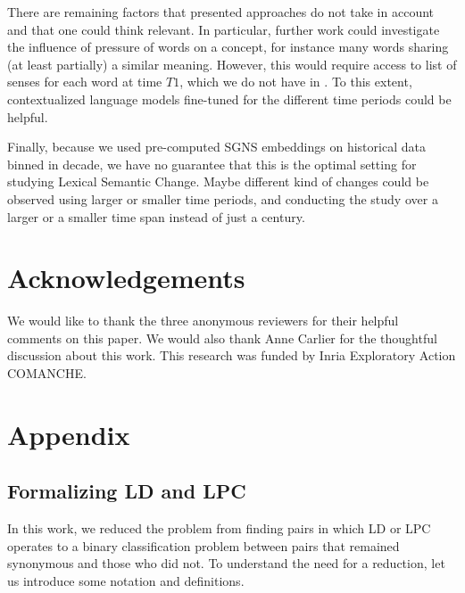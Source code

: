 \documentclass[11pt]{article}
\newcommand{\firstTime}{T1}
\begin{document}
There are remaining factors that presented approaches do not take in account and that one could think relevant. In particular, further work could investigate the influence of pressure of words on a concept, for instance many words sharing (at least partially) a similar meaning. However, this would require access to list of senses for each word at time $\firstTime$, which we do not have in \citet{fernald1896english}. To this extent, contextualized language models fine-tuned for the different time periods could be helpful.


Finally, because we used pre-computed SGNS embeddings on historical data binned in decade, we have no guarantee that this is the optimal setting for studying Lexical Semantic Change. Maybe different kind of changes could be observed using larger or smaller time periods, and conducting the study over a larger or a smaller time span instead of just a century.


\section*{Acknowledgements}

We would like to thank the three anonymous reviewers for their helpful comments on this paper. We would also thank Anne Carlier for the thoughtful discussion about this work. This research was funded by Inria Exploratory Action COMANCHE.





\appendix

\section{Appendix}
\label{sec:appendix}

\subsection{Formalizing LD and LPC}
\label{appendix:formalizing}

In this work, we reduced the problem from finding pairs in which LD or LPC operates to a binary classification problem between pairs that remained synonymous and those who did not. To understand the need for a reduction, let us introduce some notation and definitions. 
\end{document}
